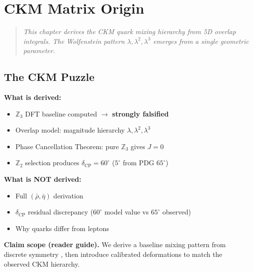 \chapter{CKM Matrix Origin}
\label{ch:ckm}

\begin{quote}
\textit{This chapter derives the CKM quark mixing hierarchy from 5D
overlap integrals. The Wolfenstein pattern $\lambda, \lambda^2, \lambda^3$
emerges from a single geometric parameter.}
\end{quote}

\section{The CKM Puzzle}
\label{sec:ckm_puzzle}

\begin{tcolorbox}[edcGuardrail, title=\textbf{Epistemic Status}]
\textbf{What is derived:}
\begin{itemize}[nosep]
    \item $\mathbb{Z}_3$ DFT baseline computed \tagDc{} $\to$ \textbf{strongly falsified}
    \item Overlap model: magnitude hierarchy $\lambda, \lambda^2, \lambda^3$ \tagDc{}
    \item Phase Cancellation Theorem: pure $\mathbb{Z}_3$ gives $J = 0$ \tagDc{}
    \item $\mathbb{Z}_2$ selection produces $\delta_{\text{CP}} = 60^\circ$ ($5^\circ$ from PDG $65^\circ$) \tagDc{}
\end{itemize}

\textbf{What is NOT derived:}
\begin{itemize}[nosep]
    \item Full $(\bar\rho, \bar\eta)$ derivation
    \item $\delta_{\text{CP}}$ residual discrepancy ($60^\circ$ model value vs $65^\circ$ observed)
    \item Why quarks differ from leptons
\end{itemize}
\end{tcolorbox}

\medskip
\noindent\textbf{Claim scope (reader guide).}
We derive a baseline mixing pattern from discrete symmetry \tagDerSym{}, then introduce
calibrated deformations \tagCal{} to match the observed CKM hierarchy.

